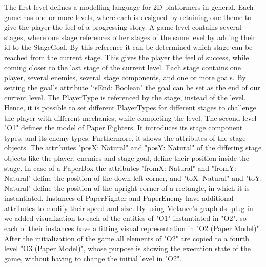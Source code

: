 The first level defines a modelling language for 2D platformers in general. Each game has one or more levels, where each is designed by retaining one theme to give the player the feel of a progressing story. A game level contains several stages, where one stage references other stages of the same level by adding their id to the StageGoal. By this reference it can be determined which stage can be reached from the current stage. This gives the player the feel of success, while coming closer to the last stage of the current level. Each stage contains one player, several enemies, several stage components, and one or more goals. By setting the goal’s attribute "isEnd: Boolean" the goal can be set as the end of our current level. The PlayerType is referenced by the stage, instead of the level. Hence, it is possible to set different PlayerTypes for different stages to challenge the player with different mechanics, while completing the level. The second level "O1" defines the model of Paper Fighters. It introduces its stage component types, and its enemy types. Furthermore, it shows the attributes of the stage objects. The attributes "posX: Natural" and "posY: Natural" of the differing stage objects like the player, enemies and stage goal, define their position inside the stage. In case of a PaperBox the attributes "fromX: Natural" and "fromY: Natural" define the position of the down left corner, and "toX: Natural" and "toY: Natural" define the position of the upright corner of a rectangle, in which it is instantiated. Instances of PaperFighter and PaperEnemy have additional attributes to modify their speed and size. By using Melanee’s graph-dsl plug-in we added visualization to each of the entities of "O1" instantiated in "O2", so each of their instances have a fitting visual representation in "O2 (Paper Model)".
After the initialization of the game all elements of "O2" are copied to a fourth level "O3 (Paper Model)", whose purpose is showing the execution state of the game, without having to change the initial level in "O2".